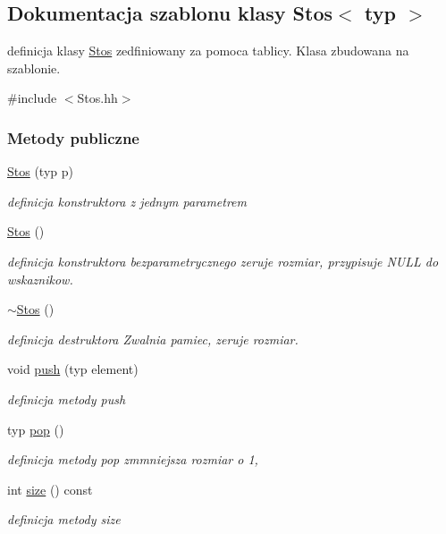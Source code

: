 \hypertarget{class_stos}{}\subsection{Dokumentacja szablonu klasy Stos$<$ typ $>$}
\label{class_stos}


definicja klasy \hyperlink{class_stos}{Stos} zedfiniowany za pomoca tablicy. Klasa zbudowana na szablonie.  




{\ttfamily \#include $<$Stos.\+hh$>$}

\subsubsection*{Metody publiczne}
\begin{DoxyCompactItemize}
\item 
\hyperlink{class_stos_af6c53f2458ebd95fd992a14fef6712d0}{Stos} (typ p)
\begin{DoxyCompactList}\small\item\em definicja konstruktora z jednym parametrem \end{DoxyCompactList}\item 
\hyperlink{class_stos_afc525fb8a9f8f80fda9bf0f846c078c4}{Stos} ()
\begin{DoxyCompactList}\small\item\em definicja konstruktora bezparametrycznego zeruje rozmiar, przypisuje N\+U\+L\+L do wskaznikow. \end{DoxyCompactList}\item 
\hyperlink{class_stos_a1e9ba3ec6f2759c1fd9a69b56b0d0c5f}{$\sim$\+Stos} ()
\begin{DoxyCompactList}\small\item\em definicja destruktora Zwalnia pamiec, zeruje rozmiar. \end{DoxyCompactList}\item 
void \hyperlink{class_stos_a51e06002fe60a5946cb2dd82cd0c0e06}{push} (typ element)
\begin{DoxyCompactList}\small\item\em definicja metody push \end{DoxyCompactList}\item 
typ \hyperlink{class_stos_a779da9dd1daf1118cd4b213401a4e1ed}{pop} ()
\begin{DoxyCompactList}\small\item\em definicja metody pop zmmniejsza rozmiar o 1, \end{DoxyCompactList}\item 
int \hyperlink{class_stos_aedf6a4f76e7f0bce073a21be4db7163c}{size} () const 
\begin{DoxyCompactList}\small\item\em definicja metody size \end{DoxyCompactList}\end{DoxyCompactItemize}
